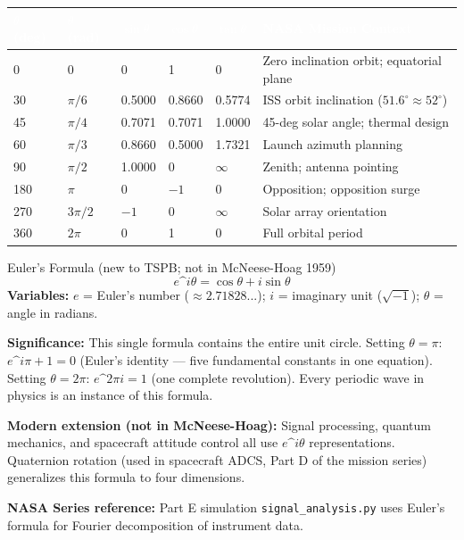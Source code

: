 \documentclass[11pt,letterpaper]{article}
\newcommand{\tableheader}[1]{\textbf{\sffamily\textcolor{white}{#1}}}
\begin{document}
\begin{center}
\begin{tabularx}{\textwidth}{C{1.8cm}C{1.8cm}C{1.8cm}C{1.8cm}C{1.8cm}X}
\toprule
{}
\tableheader{$\theta$ (deg)} & \tableheader{$\theta$ (rad)} & \tableheader{$\sin\theta$} & \tableheader{$\cos\theta$} & \tableheader{$\tan\theta$} & \tableheader{NASA Mission Context} \\
 & 0 & 0 & 1 & 0 & Zero inclination orbit; equatorial plane \\
30 & $\pi/6$ & 0.5000 & 0.8660 & 0.5774 & ISS orbit inclination ($51.6^\circ \approx 52^\circ$) \\
45 & $\pi/4$ & 0.7071 & 0.7071 & 1.0000 & 45-deg solar angle; thermal design \\
60 & $\pi/3$ & 0.8660 & 0.5000 & 1.7321 & Launch azimuth planning \\
90 & $\pi/2$ & 1.0000 & 0 & $\infty$ & Zenith; antenna pointing \\
180 & $\pi$ & 0 & $-1$ & 0 & Opposition; opposition surge \\
270 & $3\pi/2$ & $-1$ & 0 & $\infty$ & Solar array orientation \\
360 & $2\pi$ & 0 & 1 & 0 & Full orbital period \\
\bottomrule
\end{tabularx}
\end{center}

\begin{formulabox}{Euler's Formula (new to TSPB; not in McNeese-Hoag 1959)}
\[
e\^{}{i\theta} = \cos\theta + i\sin\theta
\]
\textbf{Variables:} $e$ = Euler's number ($\approx 2.71828...$); $i$ = imaginary unit ($\sqrt{-1}$); $\theta$ = angle in radians.

\textbf{Significance:} This single formula contains the entire unit circle. Setting $\theta = \pi$: $e\^{}{i\pi} + 1 = 0$ (Euler's identity --- five fundamental constants in one equation). Setting $\theta = 2\pi$: $e\^{}{2\pi i} = 1$ (one complete revolution). Every periodic wave in physics is an instance of this formula.

\textbf{Modern extension (not in McNeese-Hoag):} Signal processing, quantum mechanics, and spacecraft attitude control all use $e\^{}{i\theta}$ representations. Quaternion rotation (used in spacecraft ADCS, Part D of the mission series) generalizes this formula to four dimensions.

\textbf{NASA Series reference:} Part E simulation \texttt{signal\_analysis.py} uses Euler's formula for Fourier decomposition of instrument data.
\end{formulabox}
\end{document}
